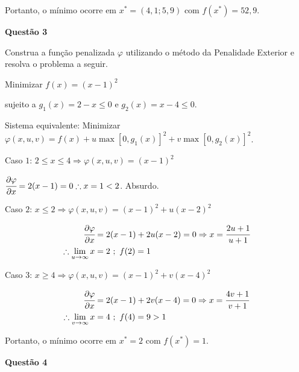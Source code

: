 \documentclass{rbfin}
\begin{document}
Portanto, o mínimo ocorre em $x^* = (4,1;5,9)$ com $f(x^*) = 52,9$.

\singlespacing

\vspace{6mm}

\large

\textbf{Questão 3}

\normalsize

\vspace{6mm}

\doublespacing

Construa a função penalizada $\varphi$ utilizando o método da Penalidade Exterior e
resolva o problema a seguir.

Minimizar $f(x) = (x-1)^2$

sujeito a $g_1(x) = 2-x \le 0$ e $g_2(x) = x - 4 \le 0$.

Sistema equivalente: Minimizar $\varphi(x,u,v) = f(x) + u \max[0,g_1(x)]^2 + v \max[0,g_2(x)]^2$. 

Caso $1$: $2 \le x \le 4 \Rightarrow \varphi(x,u,v) = (x-1)^2$

$\cfrac{\partial \varphi}{\partial x} = 2(x - 1) = 0 \therefore x = 1 < 2$. Absurdo.

Caso $2$: $x \le 2 \Rightarrow \varphi(x,u,v) = (x-1)^2 + u (x - 2)^2$

\begin{align*}
\cfrac{\partial \varphi}{\partial x} &= 2(x-1) + 2u (x - 2) = 0 \Rightarrow x = \cfrac{2u + 1}{u + 1} \\
\therefore \lim_{u \to \infty} x &= 2\,\,;\,\,f(2) = 1
\end{align*}

Caso $3$: $x \ge 4 \Rightarrow \varphi(x,u,v) = (x-1)^2 + v (x-4)^2$

\begin{align*}
\cfrac{\partial \varphi}{\partial x} &= 2(x-1) + 2v (x - 4) = 0 \Rightarrow x = \cfrac{4v + 1}{v + 1} \\
\therefore \lim_{v \to \infty} x &= 4\,\,;\,\,f(4) = 9 > 1
\end{align*}

Portanto, o mínimo ocorre em $x^* = 2$ com $f(x^*) = 1$.

\singlespacing

\large

\textbf{Questão 4}

\normalsize

\vspace{6mm}

\doublespacing
\end{document}
